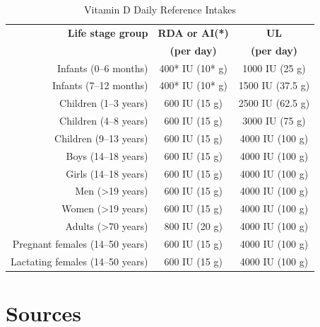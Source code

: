 \documentclass{book}
\begin{document}
\begin{sloppypar}
\begin{table}[ht]
	\caption{Vitamin D Daily Reference Intakes}
	\centering \begin{tabular}{| r | c | c |}
		\hline
		\textbf{Life stage group} & \textbf{RDA or AI(*)} & \textbf{UL}\\
		& \textbf{(per day)} & \textbf{(per day)}\\ \hline
		Infants (0--6 months) & 400* IU (10* \textmu g) & 1000 IU (25 \textmu g)\\ \hline
		Infants (7--12 months) & 400* IU (10* \textmu g) & 1500 IU (37.5 \textmu g)\\ \hline
		Children (1--3 years) & 600 IU (15 \textmu g) & 2500 IU (62.5 \textmu g)\\ \hline
		Children (4--8 years) & 600 IU (15 \textmu g) & 3000 IU (75 \textmu g)\\ \hline
		Children (9--13 years) & 600 IU (15 \textmu g) & 4000 IU (100 \textmu g)\\ \hline
		Boys (14--18 years) & 600 IU (15 \textmu g) & 4000 IU (100 \textmu g)\\ \hline
		Girls (14--18 years) & 600 IU (15 \textmu g) & 4000 IU (100 \textmu g)\\ \hline
		Men (\textgreater19 years) & 600 IU (15 \textmu g) & 4000 IU (100 \textmu g)\\ \hline
		Women (\textgreater19 years) & 600 IU (15 \textmu g) & 4000 IU (100 \textmu g)\\ \hline
		Adults (\textgreater70 years) & 800 IU (20 \textmu g) & 4000 IU (100 \textmu g)\\ \hline
		Pregnant females (14--50 years) & 600 IU (15 \textmu g) & 4000 IU (100 \textmu g)\\ \hline
		Lactating females (14--50 years) & 600 IU (15 \textmu g) & 4000 IU (100 \textmu g)\\ \hline
	\end{tabular}
\end{table}
\newpage


\section{Sources}



\end{sloppypar}
\end{document}
